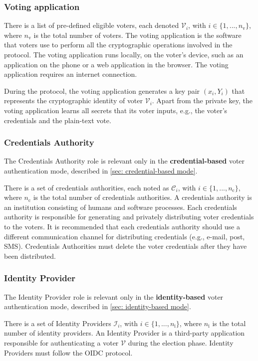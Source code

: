 \subsubsection{Voting application}
There is a list of pre-defined eligible voters, each denoted $\mathcal{V}_i$, with $i \in \{ 1, ..., n_\mathrm{v} \}$, where $n_\mathrm{v}$ is the total number of voters. The voting application is the software that voters use to perform all the cryptographic operations involved in the protocol. The voting application runs locally, on the voter's device, such as an application on the phone or a web application in the browser. The voting application requires an internet connection.

During the protocol, the voting application generates a key pair $(x_i, Y_i)$ that represents the cryptographic identity of voter $\mathcal{V}_i$. Apart from the private key, the voting application learns all secrets that its voter inputs, e.g., the voter's credentials and the plain-text vote.


\subsubsection{Credentials Authority}
The Credentials Authority role is relevant only in the \textbf{credential-based} voter authentication mode, described in \cref{sec: credential-based mode}.
    
There is a set of credentials authorities, each noted as $\mathcal{C}_i$, with $i \in \{ 1, ..., n_\mathrm{c} \}$, where $n_\mathrm{c}$ is the total number of credentials authorities. A credentials authority is an institution consisting of humans and software processes. Each credentials authority is responsible for generating and privately distributing voter credentials to the voters. It is recommended that each credentials authority should use a different communication channel for distributing credentials (e.g., e-mail, post, SMS). Credentials Authorities must delete the voter credentials after they have been distributed.


\subsubsection{Identity Provider}
The Identity Provider role is relevant only in the \textbf{identity-based} voter authentication mode, described in \cref{sec: identity-based mode}.
    
There is a set of Identity Providers $\mathcal{I}_i$, with $i \in \{ 1, ..., n_\mathrm{i} \}$, where $n_\mathrm{i}$ is the total number of identity providers. An Identity Provider is a third-party application responsible for authenticating a voter $\mathcal{V}$ during the election phase. Identity Providers must follow the OIDC protocol.


